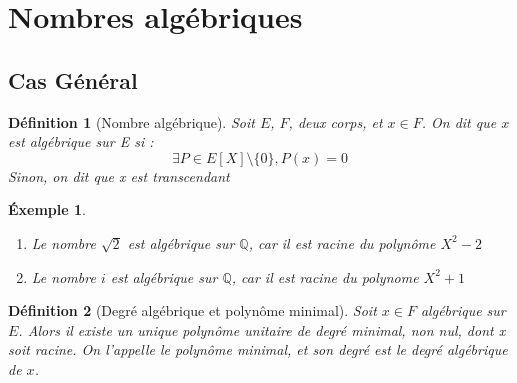 \documentclass[a4paper,12pt,french,draft]{report}
\newtheorem{definition}{Définition}[section]
\newtheorem{exemple}{Éxemple}[section]
\begin{document}
    
		\section{Nombres algébriques}
			\subsection{Cas Général}
			\begin{definition}[Nombre algébrique]
				Soit \(E\), \(F\), deux corps,  et \(x \in F\). On dit que \(x\) est \emph{algébrique} sur E si : 
				\[
					\exists P \in E[X]\setminus\{0\} , P(x) = 0
				\]
				Sinon, on dit que x est \emph{transcendant}
			\end{definition}
			
			\begin{exemple}
			$ $
			    \begin{enumerate} 
				    \item Le nombre \(\sqrt{2}\) est algébrique sur $\mathbb{Q}$, car il est racine du polynôme \(X^{2} - 2\)
				    \item Le nombre $i$ est algébrique sur $\mathbb{Q}$, car il est racine du polynome \(X^{2} +1\)
			    \end{enumerate}
			\end{exemple}
			\begin{definition}[Degré algébrique et polynôme minimal]
				Soit \(x \in F \) algébrique sur \(E\). Alors il existe un unique polynôme unitaire de degré minimal, non nul, dont x soit racine. On l'appelle le \emph{polynôme minimal}, et son degré est le \emph{degré algébrique} de \(x\).{}
			\end{definition}
\end{document}
